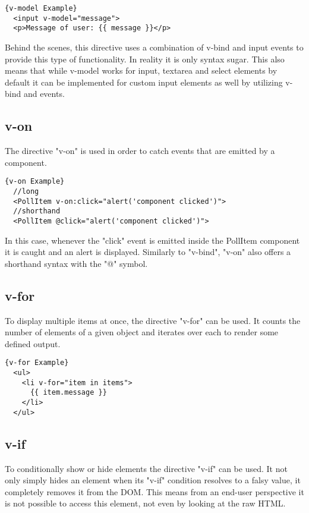 \begin{lstlisting}[caption=v-model Example, captionpos=b, style=htmlcssjs, label=vmodel]{v-model Example}
  <input v-model="message">
  <p>Message of user: {{ message }}</p>
\end{lstlisting}

Behind the scenes, this directive uses a combination of v-bind and input events to provide this type of functionality. In reality it is only syntax sugar. This also means that while v-model works for input, textarea and select elements by default it can be implemented for custom input elements as well by utilizing v-bind and events.

\subsection{v-on}
The directive "v-on" is used in order to catch events that are emitted by a component. \newline

\begin{lstlisting}[caption=v-on Example, captionpos=b, style=htmlcssjs, label=vmodel]{v-on Example}
  //long
  <PollItem v-on:click="alert('component clicked')">
  //shorthand
  <PollItem @click="alert('component clicked')">
\end{lstlisting}

In this case, whenever the "click" event is emitted inside the PollItem component it is caught and an alert is displayed. Similarly to "v-bind", "v-on" also offers a shorthand syntax with the "@" symbol. 

\subsection{v-for}
To display multiple items at once, the directive "v-for" can be used. It counts the number of elements of a given object and iterates over each to render some defined output. \newline

\begin{lstlisting}[caption=v-for Example, captionpos=b, style=htmlcssjs, label=vmodel]{v-for Example}
  <ul>
    <li v-for="item in items">
      {{ item.message }}
    </li>
  </ul>
\end{lstlisting}

\subsection{v-if}
To conditionally show or hide elements the directive "v-if" can be used. It not only simply hides an element when its "v-if" condition resolves to a falsy value, it completely removes it from the DOM. This means from an end-user perspective it is not possible to access this element, not even by looking at the raw HTML. \newline

